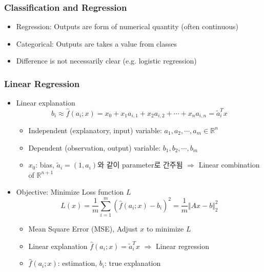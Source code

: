 \subsubsection*{Classification and Regression}
\begin{itemize}
    \item Regression: Outputs are form of numerical quantity (often continuous)
    \item Categorical: Outputs are takes a value from classes
    \item Difference is not necessarily clear (e.g. logistic regression)
\end{itemize}

\subsubsection*{Linear Regression}
\begin{itemize}
    \item Linear explanation
    \begin{equation}
        b_i\approx\hat{f}(a_i;x)=x_0+x_1a_{i,1}+x_2a_{i,2}+\cdots+x_na_{i,n}=\tilde{a}_i^Tx
    \end{equation}
    \begin{itemize}
        \item Independent (explanatory, input) variable: $a_1,a_2,\cdots,a_m\in\mathbb{R}^n$
        \item Dependent (observation, output) variable: $b_1,b_2,\cdots,b_m$
        \item $x_0$: bias, $\tilde{a}_i=(1,a_i)$와 같이 parameter로 간주됨 $\Rightarrow$ Linear combination of $\mathbb{R}^{n+1}$
    \end{itemize}
    \item Objective: Minimize Loss function $L$
    \begin{equation}
        L(x)=\frac{1}{m}\sum_{i=1}^{m}\left(\hat{f}(a_i;x)-b_i\right)^2 = \frac{1}{m}\Vert Ax-b\Vert_2^2
    \end{equation}
    \begin{itemize}
        \item Mean Square Error (MSE), Adjust $x$ to minimize $L$
        \item Linear explanation $\hat{f}(a_i;x)=\tilde{a}_i^Tx$ $\Rightarrow$ Linear regression
        \item $\hat{f}(a_i;x)$: estimation, $b_i$: true explanation
    \end{itemize}
\end{itemize}

